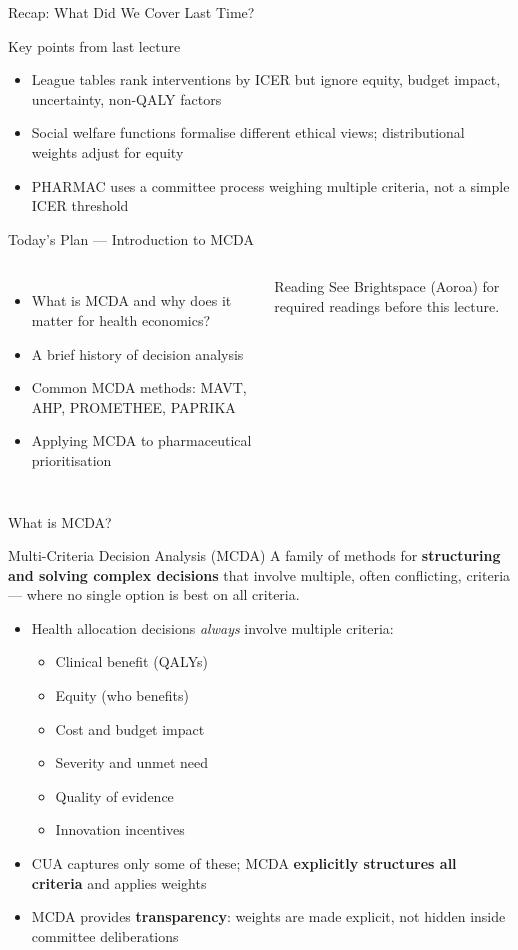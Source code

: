 \documentclass[aspectratio=169, 12pt]{beamer}
\newcommand{\recapslide}[1]{%
  \begin{frame}{Recap: What Did We Cover Last Time?}
    \begin{block}{Key points from last lecture}
      \begin{itemize}#1\end{itemize}
    \end{block}
  \end{frame}}
\newcommand{\planslide}[2]{%
  \begin{frame}{Today's Plan — #1}
    \begin{columns}
      \column{0.6\textwidth}
      \begin{itemize}#2\end{itemize}
      \column{0.38\textwidth}
      \begin{alertblock}{Reading}
        \footnotesize See Brightspace (Aoroa) for required readings before this lecture.
      \end{alertblock}
    \end{columns}
  \end{frame}}
\begin{document}
\recapslide{
  \item League tables rank interventions by ICER but ignore equity, budget impact, uncertainty, non-QALY factors
  \item Social welfare functions formalise different ethical views; distributional weights adjust for equity
  \item PHARMAC uses a committee process weighing multiple criteria, not a simple ICER threshold
}

\planslide{Introduction to MCDA}{
  \item What is MCDA and why does it matter for health economics?
  \item A brief history of decision analysis
  \item Common MCDA methods: MAVT, AHP, PROMETHEE, PAPRIKA
  \item Applying MCDA to pharmaceutical prioritisation
}

\begin{frame}{What is MCDA?}
  \begin{block}{Multi-Criteria Decision Analysis (MCDA)}
    A family of methods for \textbf{structuring and solving complex decisions} that involve
    multiple, often conflicting, criteria --- where no single option is best on all criteria.
  \end{block}
  \vspace{0.3em}
  \begin{itemize}
    \item Health allocation decisions \emph{always} involve multiple criteria:
    \begin{itemize}
      \item Clinical benefit (QALYs)
      \item Equity (who benefits)
      \item Cost and budget impact
      \item Severity and unmet need
      \item Quality of evidence
      \item Innovation incentives
    \end{itemize}
    \item CUA captures only some of these; MCDA \textbf{explicitly structures all criteria}
          and applies weights
    \item MCDA provides \textbf{transparency}: weights are made explicit, not hidden inside
          committee deliberations
  \end{itemize}
\end{frame}
\end{document}
